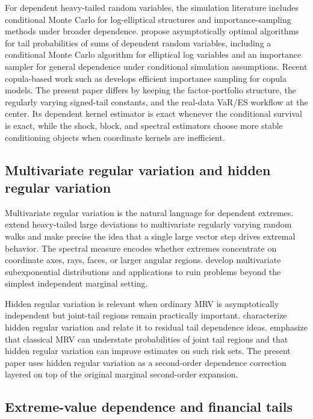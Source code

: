 For dependent heavy-tailed random variables, the simulation literature includes
conditional Monte Carlo for log-elliptical structures and importance-sampling
methods under broader dependence. \citet{BlanchetRojasNandayapa2011} propose
asymptotically optimal algorithms for tail probabilities of sums of dependent
random variables, including a conditional Monte Carlo algorithm for elliptical
log variables and an importance sampler for general dependence under conditional
simulation assumptions. Recent copula-based work such as
\citet{ChengFuhPang2025} develops efficient importance sampling for copula
models. The present paper differs by keeping the factor-portfolio structure, the
regularly varying signed-tail constants, and the real-data VaR/ES workflow at
the center. Its dependent kernel estimator is exact whenever the conditional
survival is exact, while the shock, block, and spectral estimators choose more
stable conditioning objects when coordinate kernels are inefficient.

\subsection{Multivariate regular variation and hidden regular variation}

Multivariate regular variation is the natural language for dependent extremes.
\citet{HultLindskogMikoschSamorodnitsky2005} extend heavy-tailed large
deviations to multivariate regularly varying random walks and make precise the
idea that a single large vector step drives extremal behavior. The spectral
measure encodes whether extremes concentrate on coordinate axes, rays, faces, or
larger angular regions. \citet{SamorodnitskySun2016} develop multivariate
subexponential distributions and applications to ruin problems beyond the
simplest independent marginal setting.

Hidden regular variation is relevant when ordinary MRV is asymptotically
independent but joint-tail regions remain practically important.
\citet{MaulikResnick2004} characterize hidden regular variation and relate it to
residual tail dependence ideas. \citet{DasMitraResnick2013} emphasize that
classical MRV can understate probabilities of joint tail regions and that hidden
regular variation can improve estimates on such risk sets. The present paper
uses hidden regular variation as a second-order dependence correction layered on
top of the original marginal second-order expansion.

\subsection{Extreme-value dependence and financial tails}

